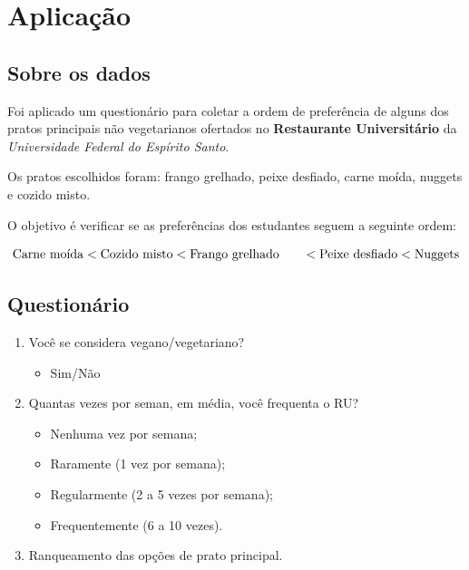 \documentclass[
  letterpaper,
  DIV=11,
  numbers=noendperiod]{scrartcl}
\providecommand{\tightlist}{%
  \setlength{\itemsep}{0pt}\setlength{\parskip}{0pt}}\usepackage{longtable,booktabs,array}
\begin{document}
\section{Aplicação}\label{aplicauxe7uxe3o}

\subsection{Sobre os dados}\label{sobre-os-dados}

Foi aplicado um questionário para coletar a ordem de preferência de
alguns dos pratos principais não vegetarianos ofertados no
\textbf{Restaurante Universitário} da \emph{Universidade Federal do
Espírito Santo}.

Os pratos escolhidos foram: frango grelhado, peixe desfiado, carne
moída, nuggets e cozido misto.

O objetivo é verificar se as preferências dos estudantes seguem a
seguinte ordem:

\[ \text{Carne moída} <  \text{Cozido misto} <  \text{Frango grelhado} \\
\quad\;\;\; < \text{Peixe desfiado} < \text{Nuggets}\]

\subsection{Questionário}\label{questionuxe1rio}

\begin{enumerate}
\def\labelenumi{\arabic{enumi}.}
\tightlist
\item
  Você se considera vegano/vegetariano?

  \begin{itemize}
  \tightlist
  \item
    Sim/Não
  \end{itemize}
\item
  Quantas vezes por seman, em média, você frequenta o RU?

  \begin{itemize}
  \tightlist
  \item
    Nenhuma vez por semana;
  \item
    Raramente (1 vez por semana);
  \item
    Regularmente (2 a 5 vezes por semana);
  \item
    Frequentemente (6 a 10 vezes).
  \end{itemize}
\item
  Ranqueamento das opções de prato principal.
\end{enumerate}
\end{document}
